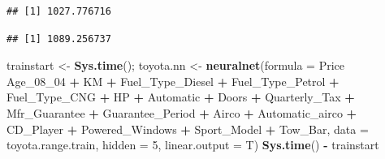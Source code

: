 \documentclass[]{article}
\newenvironment{Shaded}{\begin{snugshade}}{\end{snugshade}}
\newcommand{\KeywordTok}[1]{\textcolor[rgb]{0.13,0.29,0.53}{\textbf{#1}}}
\newcommand{\DataTypeTok}[1]{\textcolor[rgb]{0.13,0.29,0.53}{#1}}
\newcommand{\DecValTok}[1]{\textcolor[rgb]{0.00,0.00,0.81}{#1}}
\newcommand{\StringTok}[1]{\textcolor[rgb]{0.31,0.60,0.02}{#1}}
\newcommand{\CommentTok}[1]{\textcolor[rgb]{0.56,0.35,0.01}{\textit{#1}}}
\newcommand{\OperatorTok}[1]{\textcolor[rgb]{0.81,0.36,0.00}{\textbf{#1}}}
\newcommand{\NormalTok}[1]{#1}
\begin{document}
\begin{verbatim}
## [1] 1027.776716
\end{verbatim}

\begin{Shaded}
\end{Shaded}

\begin{verbatim}
## [1] 1089.256737
\end{verbatim}

\begin{Shaded}
\begin{Highlighting}[]
\NormalTok{trainstart <-}\StringTok{ }\KeywordTok{Sys.time}\NormalTok{();}
\NormalTok{toyota.nn <-}\StringTok{ }\KeywordTok{neuralnet}\NormalTok{(}\DataTypeTok{formula =}\NormalTok{ Price }\OperatorTok{~}\StringTok{ }\NormalTok{Age_08_}\DecValTok{04} \OperatorTok{+}\StringTok{ }\NormalTok{KM }\OperatorTok{+}\StringTok{ }\NormalTok{Fuel_Type_Diesel }\OperatorTok{+}\StringTok{ }\NormalTok{Fuel_Type_Petrol }\OperatorTok{+}\StringTok{ }\NormalTok{Fuel_Type_CNG }\OperatorTok{+}\StringTok{ }\NormalTok{HP }\OperatorTok{+}\StringTok{ }\NormalTok{Automatic }\OperatorTok{+}\StringTok{ }\NormalTok{Doors }\OperatorTok{+}\StringTok{ }\NormalTok{Quarterly_Tax }\OperatorTok{+}\StringTok{ }\NormalTok{Mfr_Guarantee }\OperatorTok{+}\StringTok{ }\NormalTok{Guarantee_Period }\OperatorTok{+}\StringTok{ }\NormalTok{Airco }\OperatorTok{+}\StringTok{ }\NormalTok{Automatic_airco }\OperatorTok{+}\StringTok{ }\NormalTok{CD_Player }\OperatorTok{+}\StringTok{ }\NormalTok{Powered_Windows }\OperatorTok{+}\StringTok{ }\NormalTok{Sport_Model }\OperatorTok{+}\StringTok{ }\NormalTok{Tow_Bar, }\DataTypeTok{data =}\NormalTok{ toyota.range.train, }\DataTypeTok{hidden =} \DecValTok{5}\NormalTok{, }\DataTypeTok{linear.output =}\NormalTok{ T)}
\KeywordTok{Sys.time}\NormalTok{() }\OperatorTok{-}\StringTok{ }\NormalTok{trainstart}
\end{Highlighting}
\end{Shaded}
\end{document}
